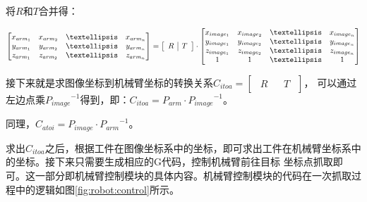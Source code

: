 将$R$和$T$合并得：

\begin{equation}
    \centering
    \begin{bmatrix}  x_{arm_1} & x_{arm_2} & …& x_{arm_n} \\ 
    y_{arm_1} & y_{arm_2} & …& y_{arm_n} \\  
    z_{arm_1} & z_{arm_2} & …& z_{arm_n} \end{bmatrix} = 
    \left [ \begin{array}{c|c} \begin{matrix} R \end{matrix}& \begin{matrix} T \end{matrix} \end{array} \right ] \cdot 
    \begin{bmatrix}  x_{image_1} & x_{image_2} & …& x_{image_n} \\  y_{image_1} & y_{image_2}  & …  & y_{image_n} \\  z_{image_1} & z_{image_2}  & …  & z_{image_n}  \\ 1&1&…&1 \end{bmatrix}
    \label{equation:loc_trans2}
\end{equation}

接下来就是求图像坐标到机械臂坐标的转换关系$C_{itoa} = \left [ \begin{array}{c|c} \begin{matrix} R \end{matrix}& \begin{matrix} T \end{matrix} \end{array} \right ]$，
可以通过左边点乘${P_{image}}^{-1}$得到，即：$C_{itoa} =  P_{arm} \cdot {P_{image}}^{-1}$。

同理，$C_{atoi} =  P_{image} \cdot {P_{arm}}^{-1}$。

求出$C_{itoa}$之后，根据工件在图像坐标系中的坐标，即可求出工件在机械臂坐标系中的坐标。接下来只需要生成相应的G代码，控制机械臂前往目标
坐标点抓取即可。这一部分即机械臂控制模块的具体内容。机械臂控制模块的代码在一次抓取过程中的逻辑如图\ref{fig:robot:control}所示。

